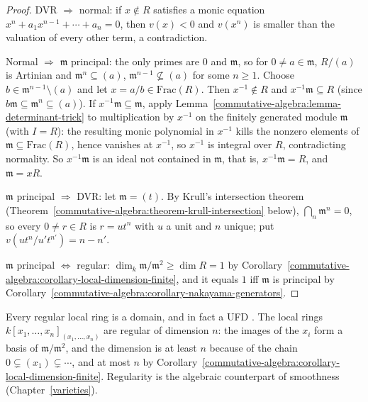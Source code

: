 \begin{proof}
DVR $\Rightarrow$ normal: if $x \notin R$ satisfies a monic equation $x^n + a_1x^{n-1} + \cdots + a_n = 0$, then $v(x) < 0$ and $v(x^n)$ is
smaller than the valuation of every other term, a contradiction.

Normal $\Rightarrow$ $\mathfrak{m}$ principal: the only primes are $0$ and $\mathfrak{m}$, so for $0 \neq a \in \mathfrak{m}$, $R/(a)$ is Artinian and
$\mathfrak{m}^n \subseteq (a)$, $\mathfrak{m}^{n-1} \not\subseteq (a)$ for some $n \geq 1$. Choose $b \in \mathfrak{m}^{n-1} \setminus (a)$ and let $x = a/b \in \mathrm{Frac}(R)$.
Then $x^{-1} \notin R$ and $x^{-1}\mathfrak{m} \subseteq R$ (since $b\mathfrak{m} \subseteq \mathfrak{m}^n \subseteq (a)$). If $x^{-1}\mathfrak{m} \subseteq \mathfrak{m}$, apply
Lemma~\ref{commutative-algebra:lemma-determinant-trick} to multiplication by $x^{-1}$ on the finitely generated module $\mathfrak{m}$
(with $I = R$): the resulting monic polynomial in $x^{-1}$ kills the nonzero elements of $\mathfrak{m} \subseteq \mathrm{Frac}(R)$, hence
vanishes at $x^{-1}$, so $x^{-1}$ is integral over $R$, contradicting normality. So $x^{-1}\mathfrak{m}$ is an ideal not contained in
$\mathfrak{m}$, that is, $x^{-1}\mathfrak{m} = R$, and $\mathfrak{m} = xR$.

$\mathfrak{m}$ principal $\Rightarrow$ DVR: let $\mathfrak{m} = (t)$. By Krull's intersection theorem
(Theorem~\ref{commutative-algebra:theorem-krull-intersection} below), $\bigcap_n \mathfrak{m}^n = 0$, so every $0 \neq r \in R$ is
$r = ut^n$ with $u$ a unit and $n$ unique; put $v(ut^n/u't^{n'}) = n - n'$.

$\mathfrak{m}$ principal $\Leftrightarrow$ regular: $\dim_k\mathfrak{m}/\mathfrak{m}^2 \geq \dim R = 1$ by
Corollary~\ref{commutative-algebra:corollary-local-dimension-finite}, and it equals $1$ iff $\mathfrak{m}$ is principal by
Corollary~\ref{commutative-algebra:corollary-nakayama-generators}.
\end{proof}

\begin{remark}\label{commutative-algebra:remark-regular-domain}
Every regular local ring is a domain, and in fact a UFD \cite[Theorems 14.3 and 20.3]{matsumura-crt}. The local rings
$k[x_1, \ldots, x_n]_{(x_1, \ldots, x_n)}$ are regular of dimension $n$: the images of the $x_i$ form a basis of $\mathfrak{m}/\mathfrak{m}^2$, and the
dimension is at least $n$ because of the chain $0 \subsetneq (x_1) \subsetneq \cdots$, and at most $n$ by
Corollary~\ref{commutative-algebra:corollary-local-dimension-finite}. Regularity is the algebraic counterpart of smoothness
(Chapter~\ref{varieties}).
\end{remark}

